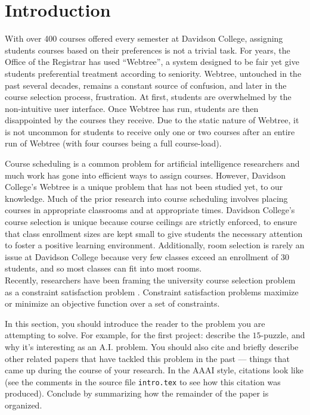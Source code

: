
\section{Introduction}
\label{sec:intro}

With over 400 courses offered every semester at Davidson College,
assigning students courses based on their preferences is not a trivial
task. For years, the Office of the Registrar has used ``Webtree'', a
system designed to be fair yet give students preferential treatment
according to seniority. Webtree, untouched in the past several decades, remains a constant
source of confusion, and later in the course selection process,
frustration. At first, students are overwhelmed by the non-intuitive
user interface. Once Webtree has run, students are then disappointed
by the courses they receive. Due to the static nature of Webtree, it
is not uncommon for students to receive only one or two courses after
an entire run of Webtree (with four courses being a full
course-load). 

Course scheduling is a common problem for artificial intelligence
researchers and much work has gone into efficient ways to assign
courses. However, Davidson College's Webtree is a unique problem that
has not been studied yet, to our knowledge. Much of the prior research
into course scheduling involves placing courses in appropriate
classrooms and at appropriate times. Davidson College's course
selection is unique because course ceilings are strictly enforced, to
ensure that class enrollment sizes are kept small to give students the
necessary attention to foster a positive learning
environment. Additionally, room selection is rarely an issue at
Davidson College because very few classes exceed an enrollment of $30$
students, and so most classes can fit into most rooms.\\

Recently, researchers have been framing the university course
selection problem as a constraint satisfaction problem
\cite{darden}. Constraint satisfaction problems maximize or minimize
an objective function over a set of constraints.
 

In this section, you should introduce the reader to the problem you
are attempting to solve. For example, for the first project: describe
the $15$-puzzle, and why it's interesting as an A.I. problem. You
should also cite and briefly describe other related papers that have
tackled this problem in the past --- things that came up during the
course of your research. In the AAAI style, citations look like
\cite{aima} (see the comments in the source file \texttt{intro.tex} to
see how this citation was produced). Conclude by summarizing how the
remainder of the paper is organized. \\

